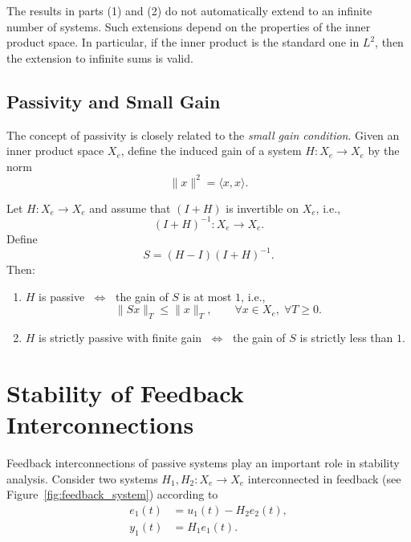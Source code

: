 \begin{remark}
The results in parts (1) and (2) do not automatically extend to an infinite number of systems.  
Such extensions depend on the properties of the inner product space. In particular, 
if the inner product is the standard one in $L^2$, then the extension to infinite sums is valid.
\end{remark}

\subsection{Passivity and Small Gain}

The concept of passivity is closely related to the \emph{small gain condition}. 
Given an inner product space $X_e$, define the induced gain of a system 
$H: X_e \to X_e$ by the norm
\begin{equation}
    \|x\|^2 = \langle x, x \rangle.
\end{equation}

\begin{theorem}
Let $H: X_e \to X_e$ and assume that $(I + H)$ is invertible on $X_e$, i.e.,
\begin{equation}
    (I + H)^{-1}: X_e \to X_e.
\end{equation}
Define
\begin{equation}
    S = (H - I)(I + H)^{-1}.
\end{equation}
Then:
\begin{enumerate}
    \item $H$ is passive $\;\Leftrightarrow\;$ the gain of $S$ is at most $1$, i.e.,
    \begin{equation}
        \|Sx\|_T \le \|x\|_T, 
        \qquad \forall x \in X_e, \; \forall T \ge 0.
    \end{equation}
    \item $H$ is strictly passive with finite gain $\;\Leftrightarrow\;$ the gain of $S$ is strictly less than $1$.
\end{enumerate}
\end{theorem}

\section{Stability of Feedback Interconnections}

Feedback interconnections of passive systems play an important role in stability 
analysis. Consider two systems $H_1, H_2 : X_e \to X_e$ interconnected in feedback 
(see Figure~\ref{fig:feedback_system}) according to
\begin{align}
    e_1(t) &= u_1(t) - H_2 e_2(t), \label{eq:stab_feedback1}\\
    y_1(t) &= H_1 e_1(t). \label{eq:stab_feedback2}
\end{align}

